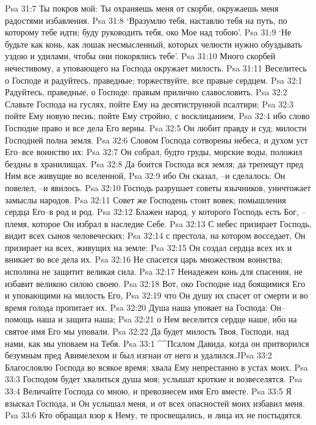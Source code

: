 Psa 31:7  Ты покров мой: Ты охраняешь меня от скорби, окружаешь меня радостями избавления.
Psa 31:8  `Вразумлю тебя, наставлю тебя на путь, по которому тебе идти; буду руководить тебя, око Мое над тобою'.
Psa 31:9  `Не будьте как конь, как лошак несмысленный, которых челюсти нужно обуздывать уздою и удилами, чтобы они покорялись тебе'.
Psa 31:10  Много скорбей нечестивому, а уповающего на Господа окружает милость.
Psa 31:11  Веселитесь о Господе и радуйтесь, праведные; торжествуйте, все правые сердцем.
Psa 32:1  Радуйтесь, праведные, о Господе: правым прилично славословить.
Psa 32:2  Славьте Господа на гуслях, пойте Ему на десятиструнной псалтири;
Psa 32:3  пойте Ему новую песнь; пойте Ему стройно, с восклицанием,
Psa 32:4  ибо слово Господне право и все дела Его верны.
Psa 32:5  Он любит правду и суд; милости Господней полна земля.
Psa 32:6  Словом Господа сотворены небеса, и духом уст Его--все воинство их:
Psa 32:7  Он собрал, будто груды, морские воды, положил бездны в хранилищах.
Psa 32:8  Да боится Господа вся земля; да трепещут пред Ним все живущие во вселенной,
Psa 32:9  ибо Он сказал, --и сделалось; Он повелел, --и явилось.
Psa 32:10  Господь разрушает советы язычников, уничтожает замыслы народов.
Psa 32:11  Совет же Господень стоит вовек; помышления сердца Его--в род и род.
Psa 32:12  Блажен народ, у которого Господь есть Бог, --племя, которое Он избрал в наследие Себе.
Psa 32:13  С небес призирает Господь, видит всех сынов человеческих;
Psa 32:14  с престола, на котором восседает, Он призирает на всех, живущих на земле:
Psa 32:15  Он создал сердца всех их и вникает во все дела их.
Psa 32:16  Не спасется царь множеством воинства; исполина не защитит великая сила.
Psa 32:17  Ненадежен конь для спасения, не избавит великою силою своею.
Psa 32:18  Вот, око Господне над боящимися Его и уповающими на милость Его,
Psa 32:19  что Он душу их спасет от смерти и во время голода пропитает их.
Psa 32:20  Душа наша уповает на Господа: Он--помощь наша и защита наша;
Psa 32:21  о Нем веселится сердце наше, ибо на святое имя Его мы уповали.
Psa 32:22  Да будет милость Твоя, Господи, над нами, как мы уповаем на Тебя.
Psa 33:1  ^^Псалом Давида, когда он притворился безумным пред Авимелехом и был изгнан от него и удалился.^^
Psa 33:2  Благословлю Господа во всякое время; хвала Ему непрестанно в устах моих.
Psa 33:3  Господом будет хвалиться душа моя; услышат кроткие и возвеселятся.
Psa 33:4  Величайте Господа со мною, и превознесем имя Его вместе.
Psa 33:5  Я взыскал Господа, и Он услышал меня, и от всех опасностей моих избавил меня.
Psa 33:6  Кто обращал взор к Нему, те просвещались, и лица их не постыдятся.
